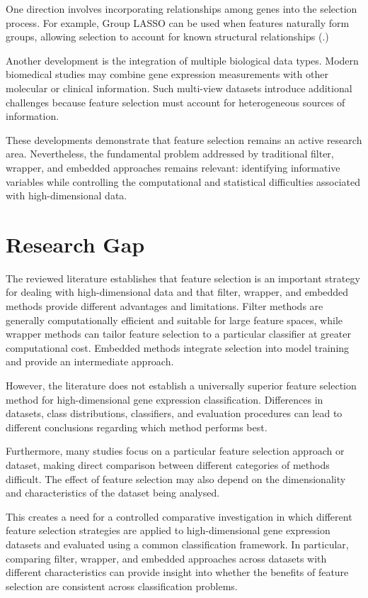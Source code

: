 One direction involves incorporating relationships among genes into the selection process. For example, Group LASSO can be used when features naturally form groups, allowing selection to account for known structural relationships (\cite{tang2013feature}.)

Another development is the integration of multiple biological data types. Modern biomedical studies may combine gene expression measurements with other molecular or clinical information. Such multi-view datasets introduce additional challenges because feature selection must account for heterogeneous sources of information.

These developments demonstrate that feature selection remains an active research area. Nevertheless, the fundamental problem addressed by traditional filter, wrapper, and embedded approaches remains relevant: identifying informative variables while controlling the computational and statistical difficulties associated with high-dimensional data.

\section{Research Gap}

The reviewed literature establishes that feature selection is an important strategy for dealing with high-dimensional data and that filter, wrapper, and embedded methods provide different advantages and limitations. Filter methods are generally computationally efficient and suitable for large feature spaces, while wrapper methods can tailor feature selection to a particular classifier at greater computational cost. Embedded methods integrate selection into model training and provide an intermediate approach.

However, the literature does not establish a universally superior feature selection method for high-dimensional gene expression classification. Differences in datasets, class distributions, classifiers, and evaluation procedures can lead to different conclusions regarding which method performs best.

Furthermore, many studies focus on a particular feature selection approach or dataset, making direct comparison between different categories of methods difficult. The effect of feature selection may also depend on the dimensionality and characteristics of the dataset being analysed.

This creates a need for a controlled comparative investigation in which different feature selection strategies are applied to high-dimensional gene expression datasets and evaluated using a common classification framework. In particular, comparing filter, wrapper, and embedded approaches across datasets with different characteristics can provide insight into whether the benefits of feature selection are consistent across classification problems.

